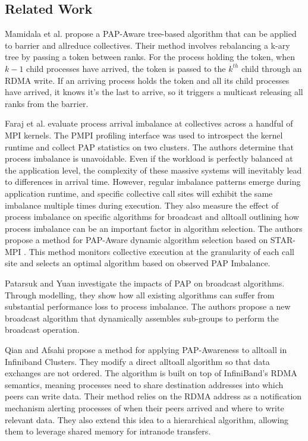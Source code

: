\subsection{Related Work}
Mamidala et al. \cite{Mamidala2004BarrierAllreduceIBAdaptive} propose a PAP-Aware tree-based algorithm that can be applied to barrier and allreduce collectives.
Their method involves rebalancing a k-ary tree by passing a token between ranks.
For the process holding the token, when $k-1$ child processes have arrived, the token is passed to the $k^{th}$ child through an RDMA write.
If an arriving process holds the token and all its child processes have arrived, it knows it's the last to arrive, so it triggers a multicast releasing all ranks from the barrier. 

Faraj et al. \cite{Faraj2008StudyProcArrivalMPIColl} evaluate process arrival imbalance at collectives across a handful of MPI kernels.
The PMPI profiling interface was used to introspect the kernel runtime and collect PAP statistics on two clusters.
The authors determine that process imbalance is unavoidable.
Even if the workload is perfectly balanced at the application level, the complexity of these massive systems will inevitably lead to differences in arrival time. 
However, regular imbalance patterns emerge during application runtime, and specific collective call sites will exhibit the same imbalance multiple times during execution.
They also measure the effect of process imbalance on specific algorithms for broadcast and alltoall outlining how process imbalance can be an important factor in algorithm selection.
The authors propose a method for PAP-Aware dynamic algorithm selection based on STAR-MPI \cite{Faraj2006StarMPI}.
This method monitors collective execution at the granularity of each call site and selects an optimal algorithm based on observed PAP Imbalance. 

Patarsuk and Yuan \cite{Patarasuk2008EffBcastDifProcArr} investigate the impacts of PAP on broadcast algorithms.
Through modelling, they show how all existing algorithms can suffer from substantial performance loss to process imbalance. 
The authors propose a new broadcast algorithm that dynamically assembles sub-groups to perform the broadcast operation.

Qian and Afsahi \cite{Qian2009ProcArrivalSHMA2AIB} propose a method for applying PAP-Awareness to alltoall in Infiniband Clusters.
They modify a direct alltoall algorithm so that data exchanges are not ordered.
The algorithm is built on top of InfiniBand's RDMA semantics, meaning processes need to share destination addresses into which peers can write data. 
Their method relies on the RDMA address as a notification mechanism alerting processes of when their peers arrived and where to write relevant data.
They also extend this idea to a hierarchical algorithm, allowing them to leverage shared memory for intranode transfers.

